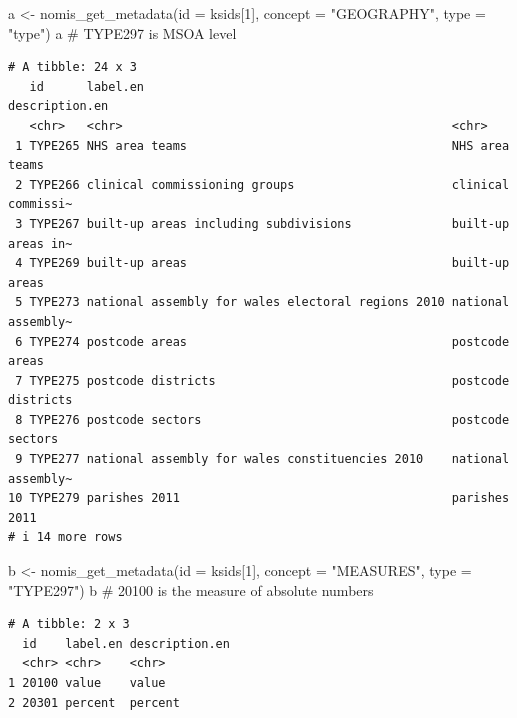 \documentclass[
  letterpaper,
  DIV=11,
  numbers=noendperiod]{scrreprt}
\newenvironment{Shaded}{\begin{snugshade}}{\end{snugshade}}
\newcommand{\AttributeTok}[1]{\textcolor[rgb]{0.40,0.45,0.13}{#1}}
\newcommand{\CommentTok}[1]{\textcolor[rgb]{0.37,0.37,0.37}{#1}}
\newcommand{\DecValTok}[1]{\textcolor[rgb]{0.68,0.00,0.00}{#1}}
\newcommand{\FunctionTok}[1]{\textcolor[rgb]{0.28,0.35,0.67}{#1}}
\newcommand{\NormalTok}[1]{\textcolor[rgb]{0.00,0.23,0.31}{#1}}
\newcommand{\OtherTok}[1]{\textcolor[rgb]{0.00,0.23,0.31}{#1}}
\newcommand{\StringTok}[1]{\textcolor[rgb]{0.13,0.47,0.30}{#1}}
\begin{document}
\begin{Shaded}
\begin{Highlighting}[]
\NormalTok{a }\OtherTok{\textless{}{-}} \FunctionTok{nomis\_get\_metadata}\NormalTok{(}\AttributeTok{id =}\NormalTok{ ksids[}\DecValTok{1}\NormalTok{], }\AttributeTok{concept =} \StringTok{"GEOGRAPHY"}\NormalTok{, }\AttributeTok{type =} \StringTok{"type"}\NormalTok{)}
\NormalTok{a }\CommentTok{\# TYPE297 is MSOA level}
\end{Highlighting}
\end{Shaded}

\begin{verbatim}
# A tibble: 24 x 3
   id      label.en                                           description.en    
   <chr>   <chr>                                              <chr>             
 1 TYPE265 NHS area teams                                     NHS area teams    
 2 TYPE266 clinical commissioning groups                      clinical commissi~
 3 TYPE267 built-up areas including subdivisions              built-up areas in~
 4 TYPE269 built-up areas                                     built-up areas    
 5 TYPE273 national assembly for wales electoral regions 2010 national assembly~
 6 TYPE274 postcode areas                                     postcode areas    
 7 TYPE275 postcode districts                                 postcode districts
 8 TYPE276 postcode sectors                                   postcode sectors  
 9 TYPE277 national assembly for wales constituencies 2010    national assembly~
10 TYPE279 parishes 2011                                      parishes 2011     
# i 14 more rows
\end{verbatim}

\begin{Shaded}
\begin{Highlighting}[]
\NormalTok{b }\OtherTok{\textless{}{-}} \FunctionTok{nomis\_get\_metadata}\NormalTok{(}\AttributeTok{id =}\NormalTok{ ksids[}\DecValTok{1}\NormalTok{], }\AttributeTok{concept =} \StringTok{"MEASURES"}\NormalTok{, }\AttributeTok{type =} \StringTok{"TYPE297"}\NormalTok{)}
\NormalTok{b }\CommentTok{\# 20100 is the measure of absolute numbers}
\end{Highlighting}
\end{Shaded}

\begin{verbatim}
# A tibble: 2 x 3
  id    label.en description.en
  <chr> <chr>    <chr>         
1 20100 value    value         
2 20301 percent  percent       
\end{verbatim}
\end{document}
